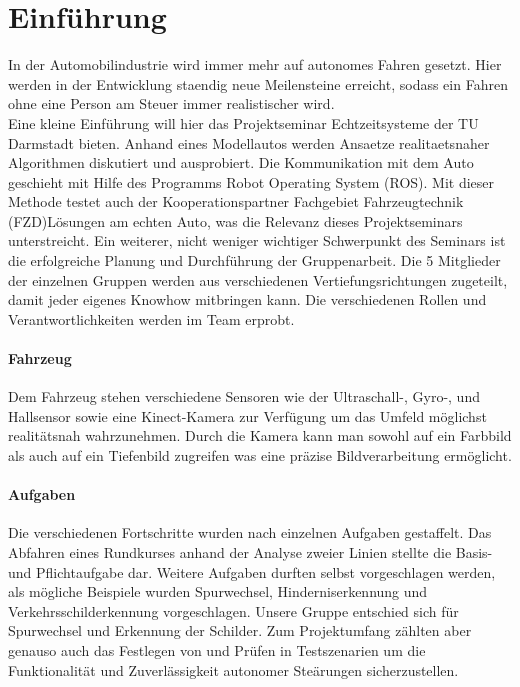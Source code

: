 \section{Einf{\"u}hrung}
\label{sec:intro}

In der Automobilindustrie wird immer mehr auf autonomes Fahren gesetzt. Hier werden in der Entwicklung staendig neue Meilensteine erreicht, sodass ein Fahren ohne eine Person am Steuer immer realistischer wird.
\\

Eine kleine Einf\"uhrung will hier das Projektseminar Echtzeitsysteme der TU Darmstadt bieten. Anhand eines Modellautos werden Ansaetze realitaetsnaher Algorithmen diskutiert und ausprobiert. Die Kommunikation mit dem Auto geschieht mit Hilfe des Programms Robot Operating System (ROS). Mit dieser Methode testet auch der Kooperationspartner \glqq Fachgebiet Fahrzeugtechnik (FZD)\grqq L\"osungen am echten Auto, was die Relevanz dieses Projektseminars unterstreicht.
Ein weiterer, nicht weniger wichtiger Schwerpunkt des Seminars ist die erfolgreiche Planung und Durchführung der Gruppenarbeit. Die 5 Mitglieder der einzelnen Gruppen werden aus verschiedenen Vertiefungsrichtungen zugeteilt, damit jeder eigenes Knowhow mitbringen kann. Die verschiedenen Rollen und Verantwortlichkeiten werden im Team erprobt.

\paragraph{Fahrzeug}
Dem Fahrzeug stehen verschiedene Sensoren wie der Ultraschall-, Gyro-, und Hallsensor sowie eine Kinect-Kamera zur Verf\"ugung um das Umfeld m\"oglichst realit\"atsnah wahrzunehmen. Durch die Kamera kann man sowohl auf ein Farbbild als auch auf ein Tiefenbild zugreifen was eine pr\"azise Bildverarbeitung erm\"oglicht.

\paragraph{Aufgaben}
Die verschiedenen Fortschritte wurden nach einzelnen Aufgaben gestaffelt. Das Abfahren eines Rundkurses anhand der Analyse zweier Linien stellte die Basis- und Pflichtaufgabe dar. Weitere Aufgaben durften selbst vorgeschlagen werden, als m\"ogliche Beispiele wurden Spurwechsel, Hinderniserkennung und Verkehrsschilderkennung vorgeschlagen.
Unsere Gruppe entschied sich f\"ur Spurwechsel und Erkennung der Schilder.
Zum Projektumfang z\"ahlten aber genauso auch das Festlegen von und Pr\"ufen in Testszenarien um die Funktionalit\"at und Zuverl\"assigkeit autonomer Ste\"arungen sicherzustellen.  
\\